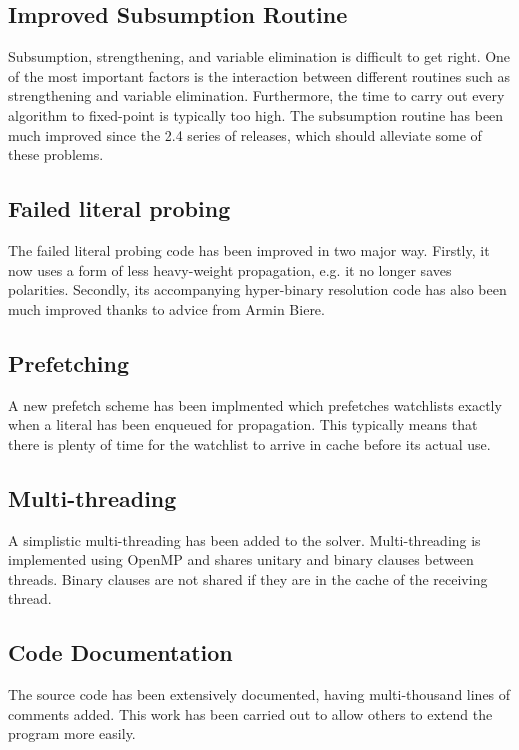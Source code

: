 \documentclass[final]{ieee}
\begin{document}
\subsection{Improved Subsumption Routine}
Subsumption, strengthening, and variable elimination is difficult to get right. One of the most important factors is the interaction between different routines such as strengthening and variable elimination. Furthermore, the time to carry out every algorithm to fixed-point is typically too high. The subsumption routine has been much improved since the 2.4 series of releases, which should alleviate some of these problems.

\subsection{Failed literal probing}
The failed literal probing code has been improved in two major way. Firstly, it now uses a form of less heavy-weight propagation, e.g. it no longer saves polarities. Secondly, its accompanying hyper-binary resolution code has also been much improved thanks to advice from Armin Biere.

\subsection{Prefetching}
A new prefetch scheme has been implmented which prefetches watchlists exactly when a literal has been enqueued for propagation. This typically means that there is plenty of time for the watchlist to arrive in cache before its actual use.

\subsection{Multi-threading}
A simplistic multi-threading has been added to the solver. Multi-threading is implemented using OpenMP and shares unitary and binary clauses between threads. Binary clauses are not shared if they are in the cache of the receiving thread.

\subsection{Code Documentation}
The source code has been extensively documented, having multi-thousand lines of comments added. This work has been carried out to allow others to extend the program more easily.

\end{document}
